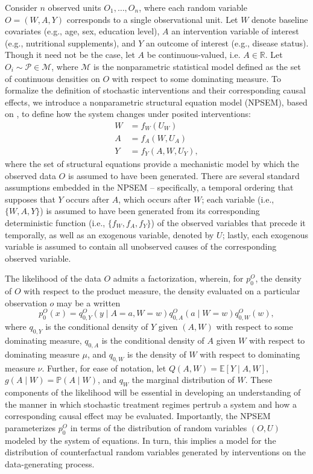 \documentclass[12pt, krantz2,]{krantz}
\theoremstyle{definition}
\theoremstyle{definition}
\theoremstyle{definition}
\renewcommand{\P}{\mathbb{P}}
\newcommand{\R}{\mathbb{R}}
\newcommand{\E}{\mathbb{E}}
\newcommand{\M}{\mathcal{M}}
\newcommand{\1}{\mathbbm{1}}
\begin{document}
Consider \(n\) observed units \(O_1, \ldots, O_n\), where each random variable \(O = (W, A, Y)\) corresponds to a single observational unit. Let \(W\) denote baseline
covariates (e.g., age, sex, education level), \(A\) an intervention variable of
interest (e.g., nutritional supplements), and \(Y\) an outcome of interest (e.g.,
disease status). Though it need not be the case, let \(A\) be continuous-valued,
i.e. \(A \in \R\). Let \(O_i \sim \mathcal{P} \in \M\), where \(\M\) is the
nonparametric statistical model defined as the set of continuous densities on
\(O\) with respect to some dominating measure. To formalize the definition of
stochastic interventions and their corresponding causal effects, we introduce a
nonparametric structural equation model (NPSEM), based on \citet{pearl2009causality},
to define how the system changes under posited interventions:
\begin{align}
  W &= f_W(U_W) \\ A &= f_A(W, U_A) \\ Y &= f_Y(A, W, U_Y),
  \label{eq:npsem-shift}
\end{align}
where the set of structural equations provide a mechanistic model by which the
observed data \(O\) is assumed to have been generated. There are several standard
assumptions embedded in the NPSEM -- specifically, a temporal ordering that
supposes that \(Y\) occurs after \(A\), which occurs after \(W\); each variable (i.e.,
\(\{W, A, Y\}\)) is assumed to have been generated from its corresponding
deterministic function (i.e., \(\{f_W, f_A, f_Y\}\)) of the observed variables
that precede it temporally, as well as an exogenous variable, denoted by \(U\);
lastly, each exogenous variable is assumed to contain all unobserved causes of
the corresponding observed variable.

The likelihood of the data \(O\) admits a factorization, wherein, for \(p_0^O\),
the density of \(O\) with respect to the product measure, the density evaluated
on a particular observation \(o\) may be a written
\begin{equation}
  p_0^O(x) = q^O_{0,Y}(y \mid A = a, W = w) q^O_{0,A}(a \mid W = w)
  q^O_{0,W}(w),
  \label{eq:likelihood-factorization-shift}
\end{equation}
where \(q_{0, Y}\) is the conditional density of \(Y\) given \((A, W)\) with respect
to some dominating measure, \(q_{0, A}\) is the conditional density of \(A\) given
\(W\) with respect to dominating measure \(\mu\), and \(q_{0, W}\) is the density of
\(W\) with respect to dominating measure \(\nu\). Further, for ease of notation, let
\(Q(A, W) = \E[Y \mid A, W]\), \(g(A \mid W) = \P(A \mid W)\), and \(q_W\) the
marginal distribution of \(W\). These components of the likelihood will be
essential in developing an understanding of the manner in which stochastic
treatment regimes pertrub a system and how a corresponding causal effect may be
evaluated. Importantly, the NPSEM parameterizes \(p_0^O\) in terms of the
distribution of random variables \((O, U)\) modeled by the system of equations. In
turn, this implies a model for the distribution of counterfactual random
variables generated by interventions on the data-generating process.
\end{document}
